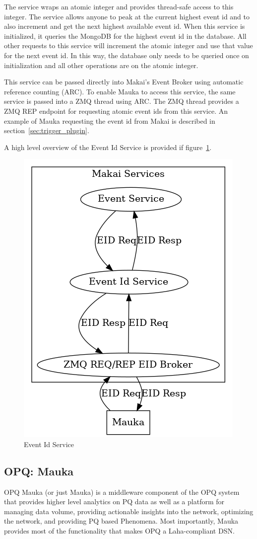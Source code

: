 The service wraps an atomic integer and provides thread-safe access to this integer. The service allows anyone to peak at the current highest event id and to also increment and get the next highest available event id. When this service is initialized, it queries the MongoDB for the highest event id in the database. All other requests to this service will increment the atomic integer and use that value for the next event id. In this way, the database only needs to be queried once on initialization and all other operations are on the atomic integer.

This service can be passed directly into Makai's Event Broker using automatic reference counting (ARC). To enable Mauka to access this service, the same service is passed into a ZMQ thread using ARC. The ZMQ thread provides a ZMQ REP endpoint for requesting atomic event ids from this service. An example of Mauka requesting the event id from Makai is described in section~\ref{sec:trigger_plugin}.

A high level overview of the Event Id Service is provided if figure~\ref{fig:eid_service}.

\begin{figure}
	\centering
	\includegraphics[width=0.7\linewidth]{figures/event_id_service.png}
	\caption{Event Id Service}
	\label{fig:eid_service}
\end{figure}

\subsection{OPQ: Mauka}\label{subsec:opq:-mauka}
OPQ Mauka (or just Mauka) is a middleware component of the OPQ system that provides higher level analytics on PQ data as well as a platform for managing data volume, providing actionable insights into the network, optimizing the network, and providing PQ based Phenomena. Most importantly, Mauka provides most of the functionality that makes OPQ a Laha-compliant DSN\@.

